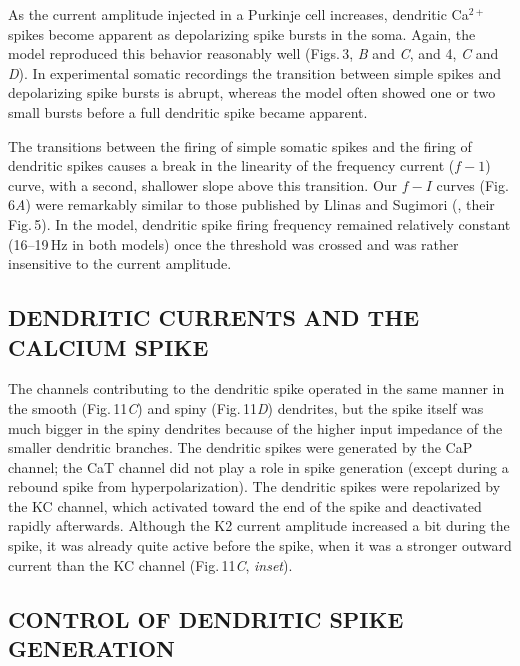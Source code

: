 \documentclass[12pt]{article}
\begin{document}
As the current amplitude injected in a 
Purkinje cell increases, dendritic Ca$^{2+}$ spikes become apparent
as depolarizing spike bursts in the soma. Again, the
model reproduced this behavior reasonably well (Figs.\,3, {\it B}
and {\it C}, and 4, {\it C} and {\it D}). In experimental somatic recordings
the transition between simple spikes and depolarizing
spike bursts is abrupt, whereas the model often showed one
or two small bursts before a full dendritic spike became
apparent.

The transitions between the firing of simple somatic
spikes and the firing of dendritic spikes causes a break in the
linearity of the frequency current ($f-1$) curve, with a second,
shallower slope above this transition. Our $f-I$ curves (Fig.\,6{\it A}) 
were remarkably similar to those published by Llinas
and Sugimori (\cite{R:1980ly}, their Fig.\,5). In the model, dendritic
spike firing frequency remained relatively constant (16--19\,Hz 
in both models) once the threshold was crossed and was
rather insensitive to the current amplitude.

\subsection*{DENDRITIC CURRENTS AND THE CALCIUM SPIKE}

The channels
contributing to the dendritic spike operated in the
same manner in the smooth (Fig.\,11{\it C}) and spiny (Fig.\,11{\it D}) 
dendrites, but the spike itself was much bigger in the
spiny dendrites because of the higher input impedance of
the smaller dendritic branches. The dendritic spikes were
generated by the CaP channel; the CaT channel did not
play a role in spike generation (except during a rebound
spike from hyperpolarization). The dendritic spikes were
repolarized by the KC channel, which activated toward the
end of the spike and deactivated rapidly afterwards. Although
the K2 current amplitude increased a bit during the
spike, it was already quite active before the spike, when it
was a stronger outward current than the KC channel (Fig.\,11{\it C}, {\it inset}).

\subsection*{CONTROL OF DENDRITIC SPIKE GENERATION}
\end{document}
